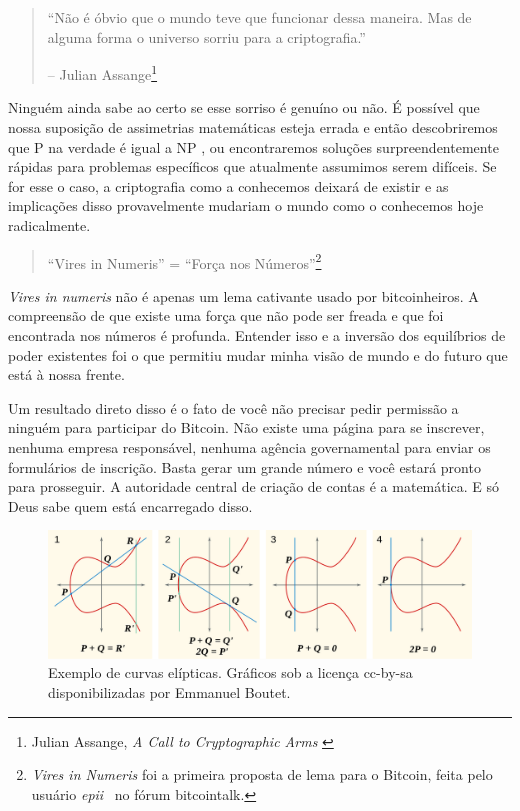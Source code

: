 \begin{quotation}\begin{samepage}
\enquote{Não é óbvio que o mundo teve que funcionar dessa maneira. Mas de alguma forma o universo sorriu para a criptografia.}
\begin{flushright} -- Julian Assange\footnote{Julian Assange, \textit{A Call to Cryptographic Arms} \cite{call-to-cryptographic-arms}}
\end{flushright}\end{samepage}\end{quotation}

Ninguém ainda sabe ao certo se esse sorriso é genuíno ou não. É possível que nossa suposição de assimetrias matemáticas esteja errada e então descobriremos que P na verdade é igual a NP \cite{wiki:pnp}, ou encontraremos soluções surpreendentemente rápidas para problemas específicos \cite{wiki:discrete-log} que atualmente assumimos serem difíceis. Se for esse o caso, a criptografia como a conhecemos deixará de existir e as implicações disso provavelmente mudariam o mundo como o conhecemos hoje radicalmente.

\begin{quotation}\begin{samepage}
\enquote{Vires in Numeris} = \enquote{Força nos Números}\footnote{\textit{Vires in Numeris} foi a primeira proposta de lema para o Bitcoin, feita pelo usuário \textit{epii}~\cite{epii} no fórum bitcointalk.}
\end{samepage}\end{quotation}

\textit{Vires in numeris} não é apenas um lema cativante usado por bitcoinheiros. A compreensão de que existe uma força que não pode ser freada e que foi encontrada nos números é profunda. Entender isso e a inversão dos equilíbrios de poder existentes foi o que permitiu mudar minha visão de mundo e do futuro que está à nossa frente.

Um resultado direto disso é o fato de você não precisar pedir permissão a ninguém para participar do Bitcoin. Não existe uma página para se inscrever, nenhuma empresa responsável, nenhuma agência governamental para enviar os formulários de inscrição. Basta gerar um grande número e você estará pronto para prosseguir. A autoridade central de criação de contas é a matemática. E só Deus sabe quem está encarregado disso.

\begin{figure}
  \includegraphics{assets/images/elliptic-curve-examples.png}
  \caption{Exemplo de curvas elípticas. Gráficos sob a licença cc-by-sa disponibilizadas por Emmanuel Boutet.}
  \label{fig:elliptic-curve-examples}
\end{figure}

